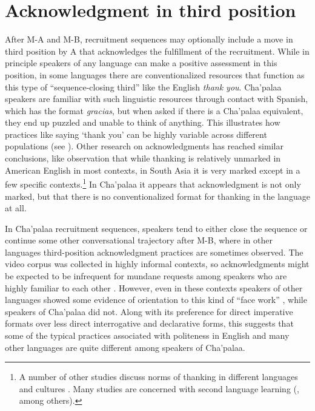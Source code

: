 \documentclass[output=paper]{langsci/langscibook}
\begin{document}
\section{Acknowledgment in third position}

After M-A and M-B, recruitment sequences may optionally include a move in third position by A that acknowledges the fulfillment of the recruitment. While in principle speakers of any language can make a positive assessment in this position, in some languages there are conventionalized resources that function as this type of “sequence-closing third” \citep{schegloff_sequence_2007} like the English \textit{thank you}. Cha'palaa speakers are familiar with such linguistic resources through contact with Spanish, which has the format \textit{gracias}, but when asked if there is a Cha'palaa equivalent, they end up puzzled and unable to think of anything. This illustrates how practices like saying ‘thank you’ can be highly variable across different populations (see \citealt{FloydEtAl2018}). Other research on acknowledgments has reached similar conclusions, like  observation that while thanking is relatively unmarked in American English in most contexts, in South Asia it is very marked except in a few specific contexts.\footnote{A number of other studies discuss norms of thanking in different languages and cultures \citep{EisensteinBodman1986,Pedersen2010,Ohashi2013}. Many studies are concerned with second language learning (\citealt{Hinkel1994,Intachakra2004,ÖzdemirRezvani2010,Cui2012,FarashaiyanHua2012}, among others).} In Cha'palaa it appears that acknowledgment is not only marked, but that there is no conventionalized format for thanking in the language at all.

In Cha’palaa recruitment sequences, speakers tend to either close the sequence or continue some other conversational trajectory after M-B, where in other languages third-position acknowledgment practices are sometimes observed. The video corpus was collected in highly informal contexts, so acknowledgments might be expected to be infrequent for mundane requests among speakers who are highly familiar to each other \citep{FloydEtAl2018}. However, even in these contexts speakers of other languages showed some evidence of orientation to this kind of “face work” \citep{Goffman1955,BrownLevinson1987}, while speakers of Cha'palaa did not. Along with its preference for direct imperative formats over less direct interrogative and declarative forms, this suggests that some of the typical practices associated with politeness in English and many other languages are quite different among speakers of Cha’palaa.
\end{document}
